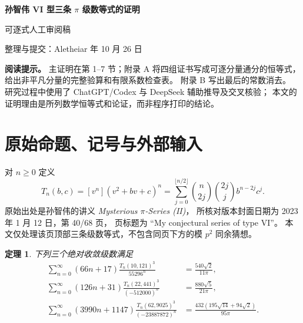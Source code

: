 \documentclass[11pt,a4paper]{article}
\numberwithin{equation}{section}
\newtheorem{theorem}{定理}[section]
\theoremstyle{remark}\newtheorem{remark}[theorem]{说明}
\begin{document}
\begin{center}
{\LARGE\bfseries 孙智伟 VI 型三条 $\pi$ 级数等式的证明}\par\vspace{0.5em}
{\large 可逐式人工审阅稿}\par\vspace{0.6em}
整理与提交：Aletheiar 年 10 月 26 日
\end{center}
\begin{abstract}
本文把 VI1、VI2、VI3 的三条无穷级数等式整理为一份不依赖程序运行的数学证明稿。
从广义中心三项式系数的母函数出发，给出全部有理函数求和证书、四分量验算规则、
微分方程的拉回、收敛与零边界论证，以及第三式的实际周期归一化和非零边界常数。
最后分别归约到两条经典 Ramanujan 求值和七次奇异模数的已知精确值。
这些古典输入的公式、使用条件和出处均明确列出。
读者只需审查本文中的有限代数恒等式与分析论证，无须 Python、JSON、历史研究日志或数值计算。
本稿供独立数学审阅，不主张首次性、专业审稿已通过或奖金资格。
\end{abstract}
\noindent\textbf{阅读提示。} 主证明在第 1--7 节；附录 A 将四组证书写成可逐分量通分的恒等式，
给出非平凡分量的完整验算和有限系数检查表。
附录 B 写出最后的常数消去。
研究过程中使用了 ChatGPT/Codex 与 DeepSeek 辅助推导及交叉核验；
本文的证明理由是所列数学恒等式和论证，而非程序打印的结论。
\setcounter{tocdepth}{1}
\tableofcontents
\newpage

\section{原始命题、记号与外部输入}
对 $n\ge0$ 定义
\begin{equation}\label{eq:Tdef}
 T_n(b,c)=[v^n](v^2+bv+c)^n
 =\sum_{j=0}^{\lfloor n/2\rfloor}\binom n{2j}\binom{2j}j b^{n-2j}c^j.
\end{equation}
原始出处是孙智伟的讲义 \emph{Mysterious $\pi$-Series (II)}，
所核对版本封面日期为 2023 年 1 月 12 日，第 40/68 页，
页标题为 ``My conjectural series of type VI''\cite{Sun}。
本文仅处理该页顶部三条级数等式，不包含同页下方的模 $p^2$ 同余猜想。

\begin{theorem}\label{thm:main}
下列三个绝对收敛级数满足
\begin{align}
 \sum_{n=0}^{\infty}(66n+17)\frac{T_n(10,121)^3}{55296^n}
 &=\frac{540\sqrt2}{11\pi},\label{eq:VI1}\\
 \sum_{n=0}^{\infty}(126n+31)\frac{T_n(22,441)^3}{(-512000)^n}
 &=\frac{880\sqrt5}{21\pi},\label{eq:VI2}\\
 \sum_{n=0}^{\infty}(3990n+1147)\frac{T_n(62,9025)^3}{(-23887872)^n}
 &=\frac{432(195\sqrt{14}+94\sqrt2)}{95\pi}.\label{eq:VI3}
\end{align}
\end{theorem}
\end{document}
